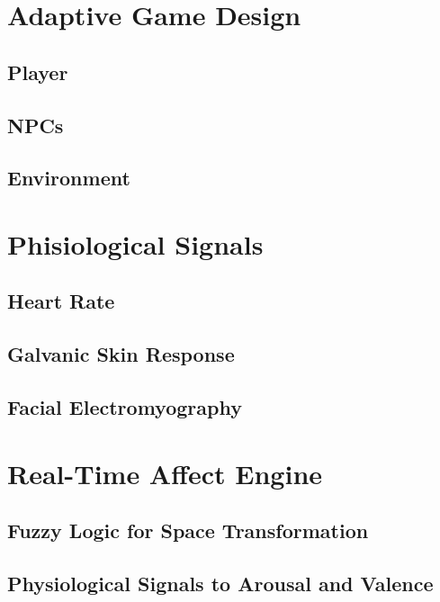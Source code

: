 
\section{Adaptive Game Design}
\subsection{Player}
\subsection{NPCs}
\subsection{Environment}

\section{Phisiological Signals}
\subsection{Heart Rate}
\subsection{Galvanic Skin Response}
\subsection{Facial Electromyography}

\section{Real-Time Affect Engine}
\subsection{Fuzzy Logic for Space Transformation}
\subsection{Physiological Signals to Arousal and Valence}
